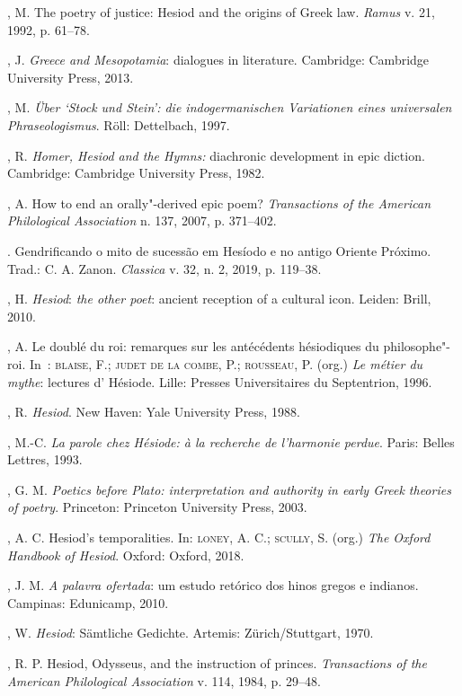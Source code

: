 \begin{bibliohedra}
, M. The poetry of justice: Hesiod and the origins of Greek law.
\emph{Ramus} v. 21, 1992, p. 61--78.

, J. \emph{Greece and Mesopotamia}: dialogues in literature.
Cambridge: Cambridge University Press, 2013.

, M. \emph{Über `Stock und Stein': die indogermanischen Variationen
eines universalen Phraseologismus}. Röll: Dettelbach, 1997.

, R. \emph{Homer, Hesiod and the Hymns:} diachronic development in
epic diction. Cambridge: Cambridge University Press, 1982.

, A. How to end an orally"-derived epic poem? \emph{Transactions of
the American Philological Association} n. 137, 2007, p. 371--402.

\titidem. Gendrificando o mito de sucessão em Hesíodo e no antigo Oriente
Próximo. Trad.: C. A. Zanon. \emph{Classica} v. 32, n. 2, 2019, p.
119--38.

, H. \emph{Hesiod}: \emph{the other poet}: ancient reception of a
cultural icon. Leiden: Brill, 2010.

, A. Le doublé du roi: remarques sur les antécédents hésiodiques du
philosophe"-roi. In~: \textsc{blaise}, F.; \textsc{judet de la combe}, P.; \textsc{rousseau}, P.
(org.) \emph{Le métier du mythe}: lectures d' Hésiode. Lille: Presses
Universitaires du Septentrion, 1996.

, R. \emph{Hesiod}. New Haven: Yale University Press, 1988.

, M.-C. \emph{La parole chez Hésiode: à la recherche de
l'harmonie perdue}. Paris: Belles Lettres, 1993.

, G. M. \emph{Poetics before Plato: interpretation and
authority in early Greek theories of poetry}. Princeton: Princeton
University Press, 2003.

, A. C. Hesiod's temporalities. In: \textsc{loney}, A. C.; \textsc{scully}, S. (org.)
\emph{The Oxford Handbook of Hesiod}. Oxford: Oxford, 2018.

, J. M. \emph{A palavra ofertada}: um estudo retórico dos hinos
gregos e indianos. Campinas: Edunicamp, 2010.

, W. \emph{Hesiod}: Sämtliche Gedichte. Artemis: Zürich/Stuttgart,
1970.

, R. P. Hesiod, Odysseus, and the instruction of princes.
\emph{Transactions of the American Philological Association} v. 114,
1984, p. 29--48.


\end{bibliohedra}
